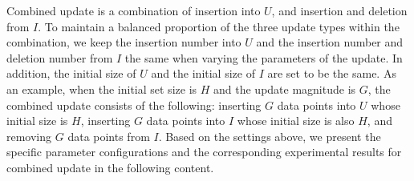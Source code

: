  Combined update is a combination of insertion into $U$, and insertion and deletion from $I$. To maintain a balanced proportion of the three update types within the combination, we keep the insertion number into $U$ and the insertion number and deletion number from $I$ the same when varying the parameters of the update. In addition, the initial size of $U$ and the initial size of $I$ are set to be the same. As an example, when the initial set size is $H$ and the update magnitude is $G$, the combined update consists of the following: inserting $G$ data points into $U$ whose initial size is $H$, inserting $G$ data points into $I$ whose initial size is also $H$, and removing $G$ data points from $I$. Based on the settings above, we present the specific parameter configurations and the corresponding experimental results for combined update in the following content.


